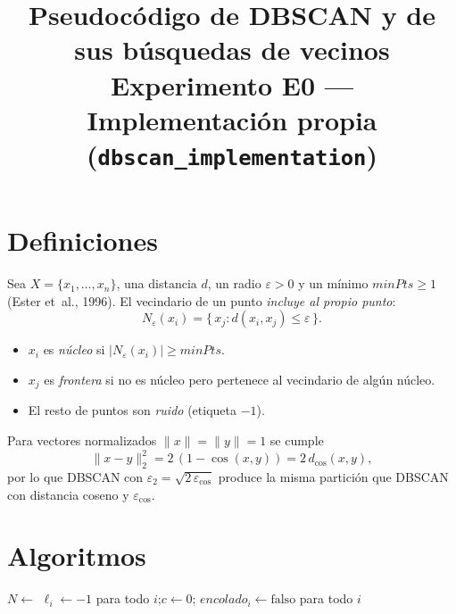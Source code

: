 \documentclass[11pt]{article}
\title{Pseudoc\'odigo de DBSCAN y de sus b\'usquedas de vecinos\\
\large Experimento E0 --- Implementaci\'on propia (\texttt{dbscan\_implementation})}
\date{}
\begin{document}
\maketitle

\section{Definiciones}

Sea $X=\{x_1,\dots,x_n\}$, una distancia $d$, un radio $\varepsilon>0$ y un
m\'inimo $\mathit{minPts}\ge 1$ (Ester et~al., 1996). El vecindario de un punto
\emph{incluye al propio punto}:
\[
  N_\varepsilon(x_i)=\{\,x_j : d(x_i,x_j)\le\varepsilon\,\}.
\]
\begin{itemize}
  \item $x_i$ es \emph{n\'ucleo} si $|N_\varepsilon(x_i)|\ge\mathit{minPts}$.
  \item $x_j$ es \emph{frontera} si no es n\'ucleo pero pertenece al
        vecindario de alg\'un n\'ucleo.
  \item El resto de puntos son \emph{ruido} (etiqueta $-1$).
\end{itemize}

Para vectores normalizados $\|x\|=\|y\|=1$ se cumple
\[
  \|x-y\|_2^2 = 2\,(1-\cos(x,y)) = 2\,d_{\cos}(x,y),
\]
por lo que DBSCAN con $\varepsilon_2=\sqrt{2\,\varepsilon_{\cos}}$ produce la
misma partici\'on que DBSCAN con distancia coseno y $\varepsilon_{\cos}$.

\section{Algoritmos}

\begin{algorithm}[H]
\caption{DBSCAN (\texttt{DBSCAN.fit}, \texttt{\_expand\_clusters})}
$N \leftarrow$ 
$\ell_i \leftarrow -1$ para todo $i$;\quad $c \leftarrow 0$;\quad
$\mathit{encolado}_i \leftarrow \text{falso}$ para todo $i$\;
\end{algorithm}
\end{document}
